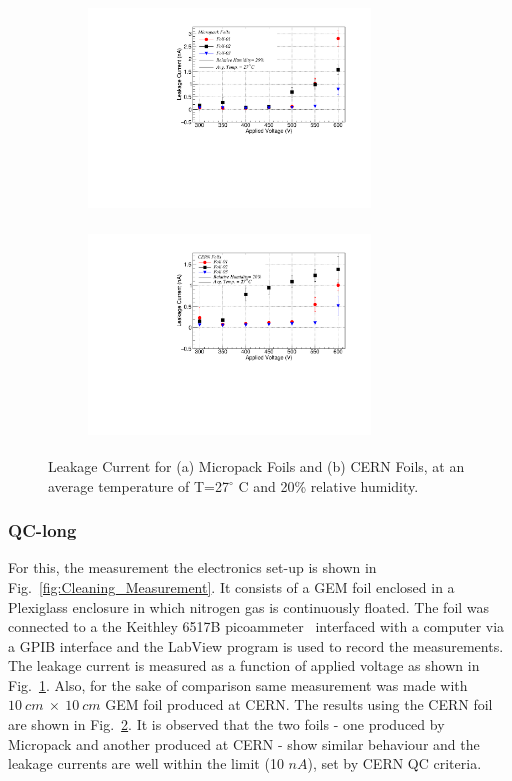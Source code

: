 \begin{figure}[!htbp]
    \centering
    \begin{subfigure}[b]{0.5\textwidth}
        \includegraphics[width=7.5cm, height=5.5cm]{figures/GEM/figures/Fig_11(a).pdf}
        \caption{ }
        \label{fig:Indian_foils_H20}
    \end{subfigure}
    \begin{subfigure}[b]{0.46\textwidth}
        \includegraphics[width=7.5cm, height=5.5cm]{figures/GEM/figures/Fig_11(b).pdf} 
        \caption{ }
        \label{fig:CERN_foils}
    \end{subfigure}
   \caption{Leakage Current for (a) Micropack Foils and (b) CERN Foils, at an average temperature of T=27$^{\circ}$ C and 20\% relative humidity.} \label{fig:L_01}
\end{figure}

\subsubsection{QC-long} %
\label{ssub:qc_long}
For this, the measurement the electronics set-up is shown in Fig.~\ref{fig:Cleaning_Measurement}.
It consists of a GEM foil enclosed in a Plexiglass enclosure in which nitrogen gas is continuously floated.
The foil was connected to a the Keithley 6517B picoammeter~\cite{Keithley-6517B-picoammeter} interfaced with a computer via a GPIB interface and the LabView program is used to record the measurements.
The leakage current is measured as a function of applied voltage as shown in Fig.~\ref{fig:Indian_foils_H20}.
Also, for the sake of comparison same measurement was made with $10~cm~\times~10~cm$ GEM foil produced at CERN.
The results using the CERN foil are shown in Fig.~\ref{fig:CERN_foils}.
It is observed that the two foils - one produced by Micropack and another produced at CERN - show similar behaviour and the leakage currents are well within the limit (10 $nA$), set by CERN QC criteria.



